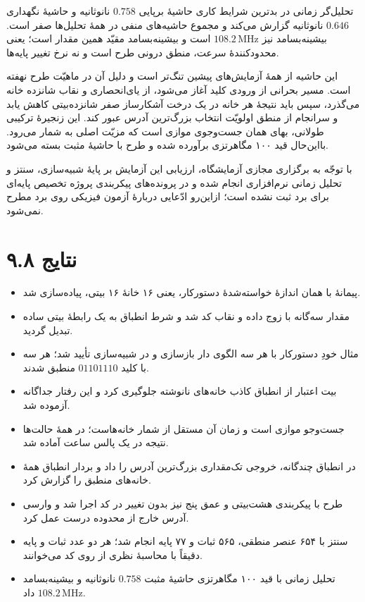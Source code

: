 \documentclass[12pt,a4paper]{article}
\begin{document}


	تحلیل‌گر زمانی در بدترین شرایط کاری حاشیهٔ برپایی \(0.758\) نانوثانیه و حاشیهٔ نگهداری \(0.646\) نانوثانیه گزارش می‌کند و مجموع حاشیه‌های منفی در همهٔ تحلیل‌ها صفر است. بیشینه‌بسامد نیز \(108.2\,\mathrm{MHz}\) است و بیشینه‌بسامد مقیّد همین مقدار است؛ یعنی محدودکنندهٔ سرعت، منطق درونی طرح است و نه نرخ تغییر پایه‌ها.


	این حاشیه از همهٔ آزمایش‌های پیشین تنگ‌تر است و دلیل آن در ماهیّت طرح نهفته است. مسیر بحرانی از ورودی کلید آغاز می‌شود، از یای‌انحصاری و نقاب شانزده خانه می‌گذرد، سپس باید نتیجهٔ هر خانه در یک درخت آشکارساز صفر شانزده‌بیتی کاهش یابد و سرانجام از منطق اولویّت انتخاب بزرگ‌ترین آدرس عبور کند. این زنجیرهٔ ترکیبی طولانی، بهای همان جست‌وجوی موازی است که مزیّت اصلی  به شمار می‌رود. بااین‌حال قید ۱۰۰ مگاهرتزی برآورده شده و طرح با حاشیهٔ مثبت بسته می‌شود.

	با توجّه به برگزاری مجازی آزمایشگاه، ارزیابی این آزمایش بر پایهٔ شبیه‌سازی، سنتز و تحلیل زمانی نرم‌افزاری انجام شده و در پرونده‌های پیکربندی پروژه تخصیص پایه‌ای برای برد ثبت نشده است؛ ازاین‌رو ادّعایی دربارهٔ آزمون فیزیکی روی برد مطرح نمی‌شود.

	\section*{۹.۸ نتایج}
	\begin{itemize}
		\item پیمانهٔ  با همان اندازهٔ خواسته‌شدهٔ دستورکار، یعنی ۱۶ خانهٔ ۱۶ بیتی، پیاده‌سازی شد.
		\item مقدار سه‌گانه با زوج داده و نقاب کد شد و شرط انطباق به یک رابطهٔ بیتی ساده تبدیل گردید.
		\item مثال خودِ دستورکار با هر سه الگوی دار بازسازی و در شبیه‌سازی تأیید شد؛ هر سه با کلید \(01101110\) منطبق شدند.
		\item بیت اعتبار از انطباق کاذب خانه‌های نانوشته جلوگیری کرد و این رفتار جداگانه آزموده شد.
		\item جست‌وجو موازی است و زمان آن مستقل از شمار خانه‌هاست؛ در همهٔ حالت‌ها نتیجه در یک پالس ساعت آماده شد.
		\item در انطباق چندگانه، خروجی تک‌مقداری بزرگ‌ترین آدرس را داد و بردار انطباق همهٔ خانه‌های منطبق را گزارش کرد.
		\item طرح با پیکربندی هشت‌بیتی و عمق پنج نیز بدون تغییر در کد اجرا شد و وارسی آدرس خارج از محدوده درست عمل کرد.
		\item سنتز با ۶۵۴ عنصر منطقی، ۵۶۵ ثبات و ۷۷ پایه انجام شد؛ هر دو عدد ثبات و پایه دقیقاً با محاسبهٔ نظری از روی کد می‌خوانند.
		\item تحلیل زمانی با قید ۱۰۰ مگاهرتزی حاشیهٔ مثبت \(0.758\) نانوثانیه و بیشینه‌بسامد \(108.2\,\mathrm{MHz}\) داد.
	\end{itemize}
\end{document}
